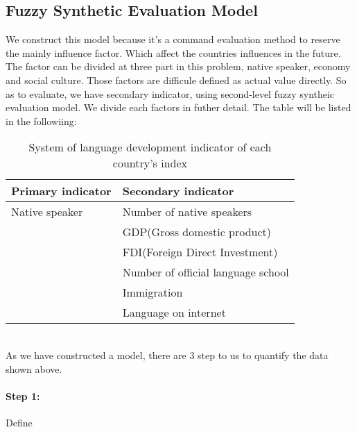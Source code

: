 \documentclass{mcmthesis}
\begin{document}
\subsection{Fuzzy Synthetic Evaluation Model}

\qquad We construct this model because it's a command evaluation method to reserve the mainly influence factor. Which affect the countries influences in the future. The factor can be divided at three part in this problem,
native speaker, economy and social culture. Those factors are difficule defined as actual value directly. So as to evaluate, we have secondary indicator, 
using second-level fuzzy syntheic evaluation model. We divide each factors in futher detail. The table will be listed in the followiing:
\begin{table}[h]
\begin{center}
\hspace{-1in}

\fontsize{10}{12}\selectfont
\setlength{\tabcolsep}{10mm} 
\begin{tabular}{l l}
\toprule
\textbf{Primary indicator}     & \textbf{Secondary indicator}    \\
\midrule
\addlinespace

Native speaker & Number of native speakers  \\
\addlinespace
\multirow{2}{*}{Economy}    & GDP(Gross domestic product) \\
 &FDI(Foreign Direct Investment)\\
\addlinespace

\multirow{3}{*}{Social culture} &  Number of official language school \\
 &Immigration \\
 &Language on internet \\

\bottomrule
\end{tabular}

\caption{System of language development indicator of each country's index}
\label{tab:chicago-table}
\end{center}
\end{table}
\\
 \qquad As we have constructed a model, there are 3 step to us to quantify the data shown above.

\paragraph {Step 1:} Define 
\end{document}
